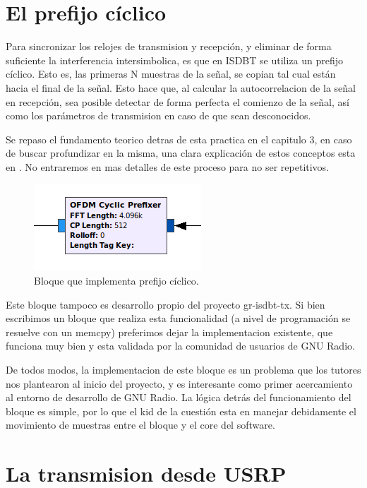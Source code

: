 \section{El prefijo cíclico}

Para sincronizar los relojes de transmision y recepción, y eliminar de forma suficiente la interferencia intersimbolica, es que en ISDBT se utiliza un prefijo cíclico. Esto es, las primeras N muestras de la señal, se copian tal cual están hacia el final de la señal. Esto hace que, al calcular la autocorrelacion de la señal en recepción, sea posible detectar de forma perfecta el comienzo de la señal, así como los parámetros de transmision en caso de que sean desconocidos. 

Se repaso el fundamento teorico detras de esta practica en el capitulo 3, en caso de buscar profundizar en la misma, una clara explicación de estos conceptos esta en \cite{gr-isdbt}. No entraremos en mas detalles de este proceso para no ser repetitivos.

\begin{figure}[!h]
	\centering
	\includegraphics[scale=0.5]{figuras/cap05/cp}
	\caption{\label{f:cp} Bloque que implementa prefijo cíclico.}
\end{figure}

Este bloque tampoco es desarrollo propio del proyecto gr-isdbt-tx. Si bien escribimos un bloque que realiza esta funcionalidad (a nivel de programación se resuelve con un memcpy) preferimos dejar la implementacion existente, que funciona muy bien y esta validada por la comunidad de usuarios de GNU Radio.

De todos modos, la implementacion de este bloque es un problema que los tutores nos plantearon al inicio del proyecto, y es interesante como primer acercamiento al entorno de desarrollo de GNU Radio. La lógica detrás del funcionamiento del bloque es simple, por lo que el kid de la cuestión esta en manejar debidamente el movimiento de muestras entre el bloque y el core del software.

\section{La transmision desde USRP}

